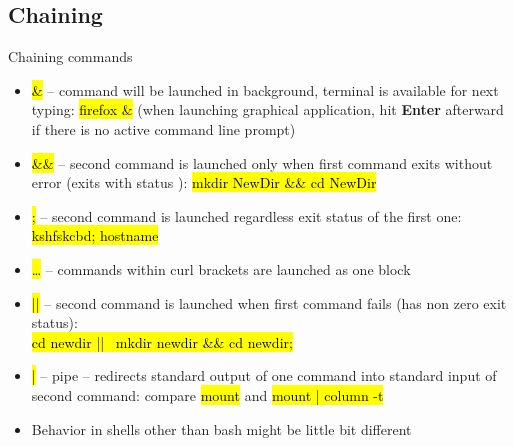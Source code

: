 \documentclass[compress, ucs, xelatex, 11pt, xcolor=svgnames,
  hyperref={
    bookmarks=true,
    unicode=true,
    colorlinks=true,
    pdftitle={Linux, command line and MetaCentrum},
    plainpages=false,
    pdfauthor={Vojtech Zeisek},
    pdfsubject={Course about use of Linux command line, writing shell scripts and using MetaCentrum of CESNET},
    pdfcreator={XeLaTeX},
    pdfkeywords={Linux, GNU, BASH, shell, command line, MetaCentrum},
    linkcolor=DarkRed,
    anchorcolor=DarkBlue,
    citecolor=Indigo,
    filecolor=NavyBlue,
    menucolor=DarkMagenta,
    urlcolor=DarkBlue,
    pdftex},
  url={hyphens, lowtilde} %
  ]{beamer}
\renewcommand{\texttt}[1]{\hl{\ttfamily #1}}
\renewcommand{\alert}[1]{\textcolor{red}{#1}}
\begin{document}
\subsection{Chaining}

\begin{frame}{Chaining commands}
  \begin{itemize}
    \item \alert{\texttt{\&}} -- command will be launched in background, terminal is available for next typing: \texttt{firefox \&} (when launching graphical application, hit \textbf{Enter} afterward if there is no active command line prompt)
    \item \alert{\texttt{\&\&}} -- second command is launched only when first command exits without error (exits with status \texttt{0}): \texttt{mkdir NewDir \&\& cd NewDir}
    \item \alert{\texttt{;}} -- second command is launched regardless exit status of the first one: \texttt{kshfskcbd; hostname}
    \item \alert{\texttt{\textbraceleft\ldots\textbraceright}} -- commands within curl brackets are launched as one block
    \item \alert{\texttt{||}} -- second command is launched when first command fails (has non zero exit status):\\\texttt{cd newdir || \textbraceleft~mkdir newdir \&\& cd newdir; \textbraceright}
    \item \alert{\texttt{|}} -- pipe -- redirects standard output of one command into standard input of second command: compare \texttt{mount} and \texttt{mount | column -t}
    \item Behavior in shells other than bash might be little bit different
  \end{itemize}
\end{frame}
\end{document}
